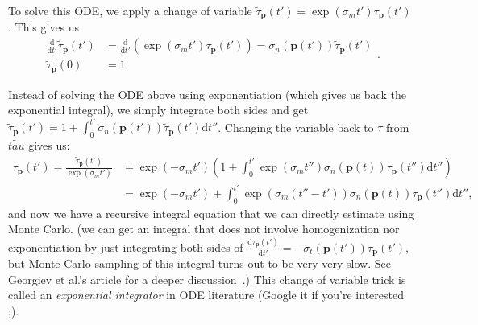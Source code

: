 To solve this ODE, we apply a change of variable $\tilde{\tau}_{\mathbf{p}}(t') = \exp\left(\sigma_m t'\right) \tau_{\mathbf{p}}(t')$. This gives us
\begin{equation}
\begin{aligned}
\frac{\mathrm{d}}{\mathrm{d}t'}\tilde{\tau}_{\mathbf{p}}(t') &= \frac{\mathrm{d}}{\mathrm{d}t'}\left(\exp\left(\sigma_m t'\right) \tau_{\mathbf{p}}(t')\right) = \sigma_n(\mathbf{p}(t')) \tilde{\tau}_{\mathbf{p}}(t') \\
\tilde{\tau}_{\mathbf{p}}(0) &= 1
\end{aligned}.
\end{equation}

Instead of solving the ODE above using exponentiation (which gives us back the exponential integral), we simply integrate both sides and get $\tilde{\tau}_{\mathbf{p}}(t') = 1 + \int_0^{t'} \sigma_n(\mathbf{p}(t')) \tilde{\tau}_{\mathbf{p}}(t') \mathrm{d}t''$. Changing the variable back to $\tau$ from $\tilde{tau}$ gives us:
\begin{equation}
\begin{aligned}
\tau_{\mathbf{p}}(t') = \frac{\tilde{\tau}_{\mathbf{p}}(t')}{\exp\left(\sigma_m t'\right)} &= \exp\left(-\sigma_m t'\right) \left(1 + \int_{0}^{t'} \exp\left(\sigma_m t''\right) \sigma_n(\mathbf{p}(t)) \tau_{\mathbf{p}}(t'') \mathrm{d}t'' \right) \\
&= \exp\left(-\sigma_m t'\right) + \int_{0}^{t'} \exp\left(\sigma_m (t''-t')\right) \sigma_n(\mathbf{p}(t)) \tau_{\mathbf{p}}(t'') \mathrm{d}t'',
\end{aligned}
\label{eq:transmittance_recursive_integral}
\end{equation}
and now we have a recursive integral equation that we can directly estimate using Monte Carlo. (we can get an integral that does not involve homogenization nor exponentiation by just integrating both sides of $\frac{\mathrm{d}\tau_\mathbf{p}\left(t'\right)}{\mathrm{d}t'} = -\sigma_t(\mathbf{p}(t'))\tau_\mathbf{p}\left(t'\right)$, but Monte Carlo sampling of this integral turns out to be very very slow. See Georgiev et al.'s article for a deeper discussion~\cite{Georgiev:2019:IFV}.) This change of variable trick is called an \emph{exponential integrator} in ODE literature (Google it if you're interested ;).

